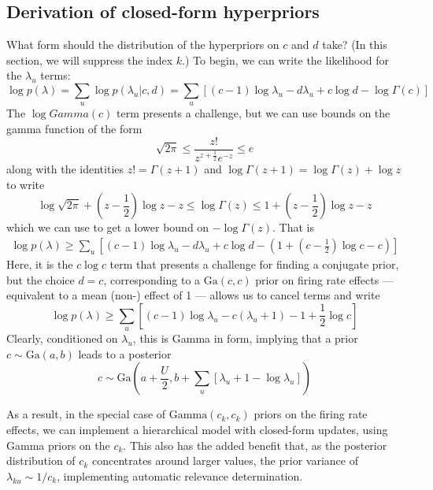 \documentclass[11pt]{article}
\begin{document}
\subsection{Derivation of closed-form hyperpriors}
What form should the distribution of the hyperpriors on $c$ and $d$ take? (In this section, we will suppress the index $k$.) To begin, we can write the likelihood for the $\lambda_u$ terms:
\begin{equation}
    \log p(\lambda) = \sum_u \log p(\lambda_u|c, d) = \sum_u \left[ 
    (c - 1) \log \lambda_u - d\lambda_u + c \log d - \log \Gamma(c) 
    \right]
\end{equation}
The $\log Gamma(c)$ term presents a challenge, but we can use bounds on the gamma function of the form
\begin{equation}
    \sqrt{2\pi} \le \frac{z!}{z^{z+\frac{1}{2}} e^{-z}} \le e
\end{equation}
along with the identities $z! = \Gamma(z + 1)$ and $\log \Gamma(z + 1) = \log \Gamma (z) + \log z$ to write
\begin{equation}
    \log \sqrt{2\pi} + \left(z - \frac{1}{2}\right)\log z - z \le
    \log \Gamma (z) \le 1 + \left(z - \frac{1}{2}\right) \log z - z
\end{equation}
which we can use to get a lower bound on $-\log \Gamma (z)$. That is
\begin{multline}
    \log p(\lambda) \ge \sum_u \left[ 
    (c - 1) \log \lambda_u - d\lambda_u + c \log d - 
    \left(1 + \left(c - \frac{1}{2}\right) \log c - c\right)
    \right]
\end{multline}
Here, it is the $c\log c$ term that presents a challenge for finding a conjugate prior, but the choice $d = c$, corresponding to a $\mathrm{Ga}(c, c)$ prior on firing rate effects --- equivalent to a mean (non-) effect of 1 --- allows us to cancel terms and write
\begin{equation}
    \log p(\lambda) \ge \sum_u \left[ 
    (c - 1) \log \lambda_u - c(\lambda_u + 1) - 1 + \frac{1}{2}\log c\right]
\end{equation}
Clearly, conditioned on $\lambda_u$, this is Gamma in form, implying that a prior $c \sim \mathrm{Ga}(a, b)$ leads to a posterior 
\begin{equation}
    c \sim \mathrm{Ga}\left(a + \frac{U}{2}, b +  
    \sum_u\left[\lambda_u + 1 - \log \lambda_u \right]\right)
\end{equation}

As a result, in the special case of $\mathrm{Gamma}(c_k, c_k)$ priors on the firing rate effects, we can implement a hierarchical model with closed-form updates, using Gamma priors on the $c_k$. This also has the added benefit that, as the posterior distribution of $c_k$ concentrates around larger values, the prior variance of $\lambda_{ku} \sim 1/c_k$, implementing automatic relevance determination.
\end{document}

